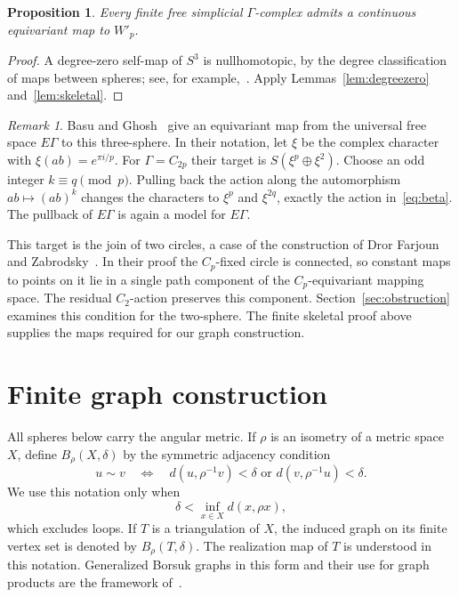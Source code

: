 \documentclass[11pt]{amsart}
\newtheorem{proposition}[theorem]{Proposition}
\theoremstyle{definition}
\theoremstyle{remark}
\newtheorem{remark}[theorem]{Remark}
\numberwithin{equation}{section}
\begin{document}
\begin{proposition}\label{prop:universal}
Every finite free simplicial $\Gamma$-complex admits a continuous equivariant map to $W'_p$.
\end{proposition}
\begin{proof}
A degree-zero self-map of $S^3$ is nullhomotopic, by the degree classification of maps between spheres; see, for example,~\cite[Corollary~4.25]{HatcherAT}. Apply Lemmas~\ref{lem:degreezero} and~\ref{lem:skeletal}.
\end{proof}

\begin{remark}\label{rem:positive}
Basu and Ghosh~\cite[Proposition~3.2]{BasuGhosh} give an equivariant map from the universal free space $E\Gamma$ to this three-sphere. In their notation, let $\xi$ be the complex character with $\xi(ab)=e^{\pi i/p}$. For $\Gamma=C_{2p}$ their target is $S(\xi^p\oplus\xi^2)$. Choose an odd integer $k\equiv q\pmod p$. Pulling back the action along the automorphism $ab\mapsto(ab)^k$ changes the characters to $\xi^p$ and $\xi^{2q}$, exactly the action in~\eqref{eq:beta}. The pullback of $E\Gamma$ is again a model for $E\Gamma$.

This target is the join of two circles, a case of the construction of Dror Farjoun and Zabrodsky~\cite[Proposition~3.3]{FarjounZabrodsky}. In their proof the $C_p$-fixed circle is connected, so constant maps to points on it lie in a single path component of the $C_p$-equivariant mapping space. The residual $C_2$-action preserves this component. Section~\ref{sec:obstruction} examines this condition for the two-sphere. The finite skeletal proof above supplies the maps required for our graph construction.
\end{remark}

\section{Finite graph construction}\label{sec:graphs}

All spheres below carry the angular metric. If $\rho$ is an isometry of a metric space $X$, define $B_\rho(X,\delta)$ by the symmetric adjacency condition
\begin{equation}\label{eq:borsuk}
 u\sim v\quad\Longleftrightarrow\quad
 d(u,\rho^{-1}v)<\delta
 \text{ or }d(v,\rho^{-1}u)<\delta.
\end{equation}
We use this notation only when
\begin{equation}\label{eq:loopless}
 \delta<\inf_{x\in X}d(x,\rho x),
\end{equation}
which excludes loops. If $T$ is a triangulation of $X$, the induced graph on its finite vertex set is denoted by $B_\rho(T,\delta)$. The realization map of $T$ is understood in this notation. Generalized Borsuk graphs in this form and their use for graph products are the framework of~\cite{Raanes}.
\end{document}
